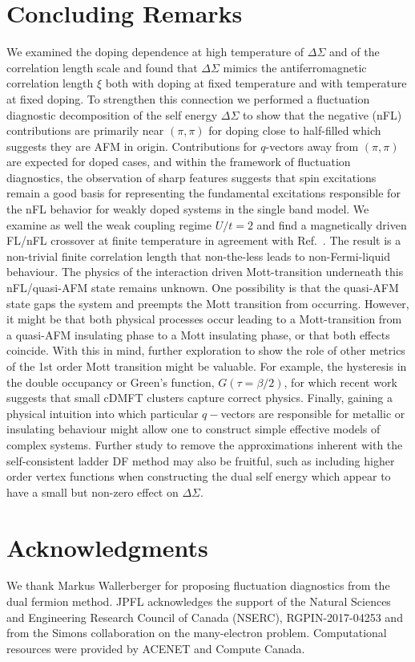 \documentclass[twocolumn,notitlepage,prb,superscriptaddress,showpacs]{revtex4-1}
\begin{document}
\section{Concluding Remarks \label{sec:conclusions}} 

 We examined the doping dependence at high temperature of $\Delta \Sigma$ and of the correlation length scale and found that $\Delta \Sigma$ mimics the antiferromagnetic correlation length $\xi$ both with doping at fixed temperature and with temperature at fixed doping.
To strengthen this connection we performed a fluctuation diagnostic decomposition of the self energy $\Delta \Sigma$ to show that the negative (nFL) contributions are primarily near $(\pi,\pi)$ for doping close to half-filled which suggests they are AFM in origin.  Contributions for $q$-vectors away from $(\pi,\pi)$ are expected for doped cases, and within the framework of fluctuation diagnostics, the observation of sharp features suggests that spin excitations remain a good basis for representing the fundamental excitations responsible for the nFL behavior for weakly doped systems in the single band model.\cite{gunnarsson:2015}
 We examine as well the weak coupling regime $U/t=2$ and find a magnetically driven FL/nFL crossover  at finite temperature in agreement with Ref.~.
The result is a non-trivial finite correlation length that non-the-less leads to non-Fermi-liquid behaviour.   The physics of the interaction driven Mott-transition underneath this nFL/quasi-AFM state remains unknown.
One possibility is that the quasi-AFM state gaps the system and preempts the Mott transition from occurring.  However, it might be that both physical processes occur leading to a Mott-transition from a quasi-AFM insulating phase to a Mott insulating phase, or that both effects coincide. 
With this in mind, further exploration to show the role of other metrics of the 1st order Mott transition might be valuable.  For example, the hysteresis in the double occupancy or Green's function, $G(\tau=\beta/2)$, for which recent work suggests that small cDMFT clusters capture correct physics.\cite{vanloon:2018:hysteresis,park:2008}   
Finally, gaining a physical intuition into which particular $q-$vectors are responsible for metallic or insulating behaviour might allow one to construct simple effective models of complex systems.  Further study to remove the approximations inherent with the self-consistent ladder DF method may also be fruitful, such as including higher order vertex functions when constructing the dual self energy which appear to have a small but non-zero effect on $\Delta \Sigma$.\cite{ribic:2017}


\section{Acknowledgments}
We thank Markus Wallerberger for proposing fluctuation diagnostics from the dual fermion method.
JPFL acknowledges the support of the Natural Sciences and Engineering Research Council of Canada (NSERC), RGPIN-2017-04253 and from the Simons collaboration on the many-electron problem. 
Computational resources were provided by ACENET and Compute Canada.



\end{document}
